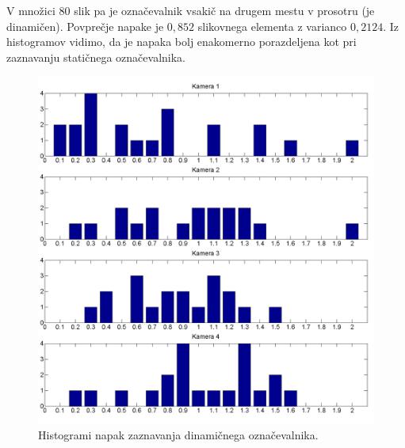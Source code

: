 \documentclass[a4paper, 12pt]{book}
\begin{document}
V množici 80 slik pa je označevalnik vsakič na drugem mestu v prosotru (je dinamičen). Povprečje napake je $0,852$ slikovnega elementa z varianco $0,2124$. Iz histogramov vidimo, da je napaka bolj enakomerno porazdeljena kot pri zaznavanju statičnega označevalnika.

\begin{figure}[H]
\centering
\includegraphics[width=\textwidth,height=\textheight,keepaspectratio]{marker_detection_dynamic_bar.png}
\caption{Histogrami napak zaznavanja dinamičnega označevalnika.}
\end{figure}
\end{document}
